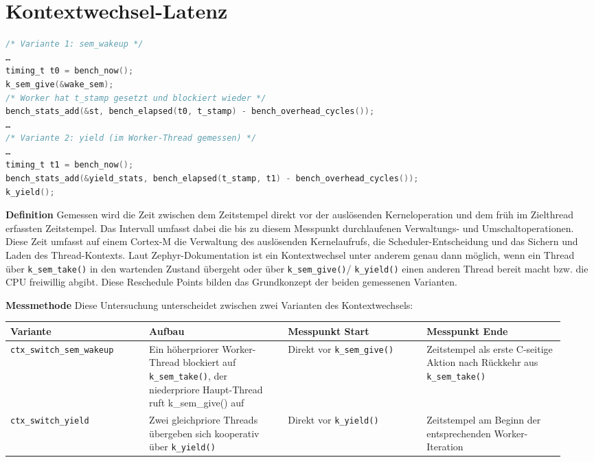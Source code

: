 \section{Kontextwechsel-Latenz}
\begin{lstlisting}[style=basecode,language=C]
/* Variante 1: sem_wakeup */
…
timing_t t0 = bench_now();
k_sem_give(&wake_sem);
/* Worker hat t_stamp gesetzt und blockiert wieder */
bench_stats_add(&st, bench_elapsed(t0, t_stamp) - bench_overhead_cycles());
…
/* Variante 2: yield (im Worker-Thread gemessen) */
…
timing_t t1 = bench_now();
bench_stats_add(&yield_stats, bench_elapsed(t_stamp, t1) - bench_overhead_cycles());
k_yield();
\end{lstlisting}
\textbf{Definition} Gemessen wird die Zeit zwischen dem Zeitstempel direkt vor der auslösenden Kerneloperation und dem früh im Zielthread erfassten Zeitstempel. Das Intervall umfasst dabei die bis zu diesem Messpunkt durchlaufenen Verwaltungs- und Umschaltoperationen. Diese Zeit umfasst auf einem Cortex-M die Verwaltung des auslösenden Kernelaufrufs, die Scheduler-Entscheidung und das Sichern und Laden des Thread-Kontexts. Laut Zephyr-Dokumentation ist ein Kontextwechsel unter anderem genau dann möglich, wenn ein Thread über \lstinline[style=fileinline]|k_sem_take()| in den wartenden Zustand übergeht oder über \lstinline[style=fileinline]|k_sem_give()|/ \lstinline[style=fileinline]|k_yield()| einen anderen Thread bereit macht bzw. die CPU freiwillig abgibt. Diese Reschedule Points bilden das Grundkonzept der beiden gemessenen Varianten.

\textbf{Messmethode} Diese Untersuchung unterscheidet zwischen zwei Varianten des Kontextwechsels:

\begin{longtable}{p{0.235\linewidth}p{0.235\linewidth}p{0.235\linewidth}p{0.235\linewidth}}
\toprule
Variante & Aufbau & Messpunkt Start & Messpunkt Ende \\
\midrule
\lstinline[style=fileinline]|ctx_switch_sem_wakeup| & Ein höherpriorer Worker-Thread blockiert auf \lstinline[style=fileinline]|k_sem_take()|, der niederpriore Haupt-Thread ruft k\_sem\_give() auf & Direkt vor \lstinline[style=fileinline]|k_sem_give()| & Zeitstempel als erste C-seitige Aktion nach Rückkehr aus \lstinline[style=fileinline]|k_sem_take()| \\
\lstinline[style=fileinline]|ctx_switch_yield| & Zwei gleichpriore Threads übergeben sich kooperativ über \lstinline[style=fileinline]|k_yield()| & Direkt vor \lstinline[style=fileinline]|k_yield()| & Zeitstempel am Beginn der entsprechenden Worker-Iteration \\
\bottomrule
\end{longtable}

